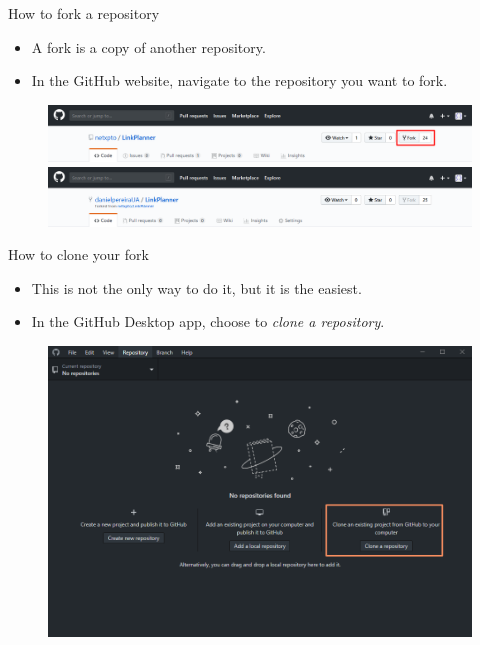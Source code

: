 \documentclass[usenames,dvipsnames,aspectratio=169]{beamer}
\newcommand{\aitem}{\item[$\cdot$]}
\begin{document}
\begin{frame}[t]{How to fork a repository}%
\begin{itemize}
\aitem A fork is a copy of another repository.
\aitem In the GitHub website, navigate to the repository you want to fork.
\end{itemize}
\begin{figure}
\centering
\includegraphics[width=\linewidth]{forking1}
\includegraphics[width=\linewidth]{forking2}
\end{figure}
\end{frame}


\begin{frame}[t]{How to clone your fork}%
\begin{minipage}{5cm}
\begin{itemize}
\aitem This is not the only way to do it, but it is the easiest.
\aitem In the GitHub Desktop app, choose to \textit{clone a repository}.
\end{itemize}
\end{minipage}%
\hspace{.5cm}%
\begin{minipage}[*]{8cm}
\begin{figure}
\centering
\includegraphics[width=\linewidth]{cloning1}
\end{figure}
\end{minipage}
\end{frame}
\end{document}
